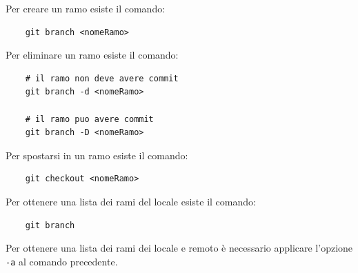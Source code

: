 Per creare un ramo esiste il comando:
\begin{lstlisting}
    git branch <nomeRamo>
\end{lstlisting}
Per eliminare un ramo esiste il comando:
\begin{lstlisting}
    # il ramo non deve avere commit
    git branch -d <nomeRamo>

    # il ramo puo avere commit
    git branch -D <nomeRamo>
\end{lstlisting}
Per spostarsi in un ramo esiste il comando:
\begin{lstlisting}
    git checkout <nomeRamo>
\end{lstlisting}
Per ottenere una lista dei rami del  locale esiste il comando:
\begin{lstlisting}
    git branch
\end{lstlisting}
Per ottenere una lista dei rami dei  locale e remoto è necessario applicare l'opzione \texttt{-a} al comando precedente.



